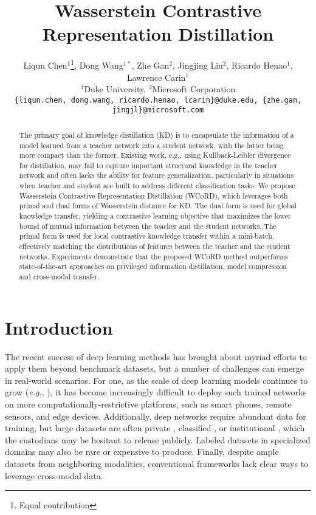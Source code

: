 \documentclass[final]{cvpr}
\theoremstyle{definition}
\begin{document}
\title{Wasserstein Contrastive Representation Distillation}

\author{Liqun Chen$^{1}$\thanks{Equal contribution}, Dong Wang$^{1*}$, Zhe Gan$^2$,  Jingjing Liu$^2$, Ricardo Henao$^1$, Lawrence Carin$^1$\\
$^1$Duke University, \quad $^2$Microsoft Corporation\\
{\tt\small \{liqun.chen, dong.wang, ricardo.henao, lcarin\}@duke.edu, \{zhe.gan, jingjl\}@microsoft.com}
}

\maketitle


\begin{abstract}
The primary goal of knowledge distillation (KD) is to encapsulate the information of a model learned from a teacher network into a student network, with the latter being more compact than the former. Existing work, e.g., using Kullback-Leibler divergence for distillation, may fail to capture important structural knowledge in the teacher network and often lacks the ability for feature generalization, particularly in situations when teacher and student are built to address different classification tasks. We propose Wasserstein Contrastive Representation Distillation (WCoRD), which leverages both primal and dual forms of Wasserstein distance for KD. The dual form is used for global knowledge transfer, yielding a contrastive learning objective that maximizes the lower bound of mutual information between the teacher and the student networks. The primal form is used for local contrastive knowledge transfer within a mini-batch, effectively matching the distributions of features between the teacher and the student networks. Experiments demonstrate that the proposed WCoRD method outperforms state-of-the-art approaches on privileged information distillation, model compression and cross-modal transfer.
\end{abstract}
\vspace{-5mm}
\section{Introduction}

The recent success of deep learning methods has brought about myriad efforts to apply them beyond benchmark datasets, but a number of challenges can emerge in real-world scenarios.
For one, as the scale of deep learning models continues to grow (\textit{e.g.}, \cite{he2016identity, devlin2018bert}), it has become increasingly difficult to deploy such trained networks on more computationally-restrictive platforms, such as smart phones, remote sensors, and edge devices.
Additionally, deep networks require abundant data for training, but large datasets are often private \cite{ribli2018detecting}, classified \cite{liang2018automatic}, or institutional \cite{sun2017revisiting}, which the custodians may be hesitant to release publicly.
Labeled datasets in specialized domains may also be rare or expensive to produce. Finally, despite ample datasets from neighboring modalities, conventional frameworks lack clear ways to leverage cross-modal data.
\end{document}
